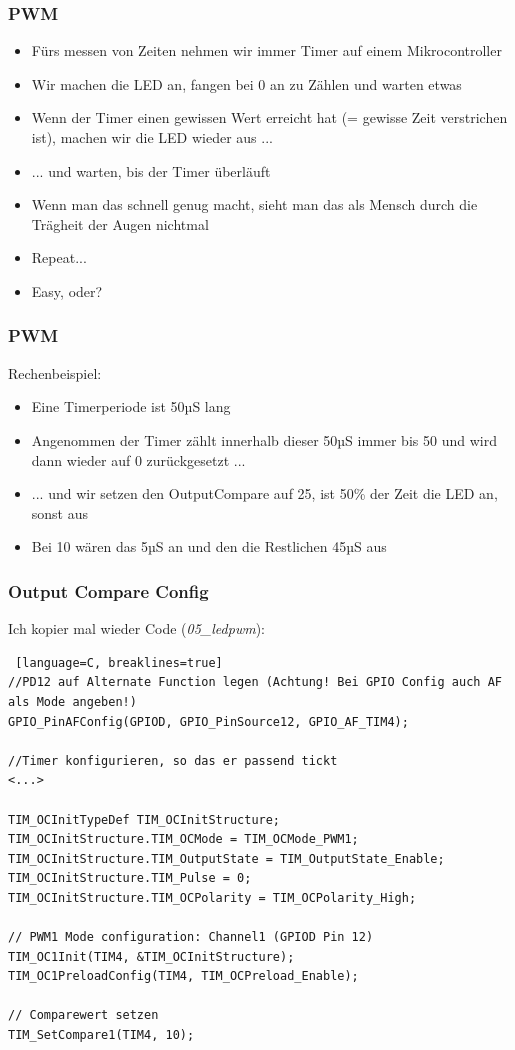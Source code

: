 \documentclass[ngerman,compress]{beamer}
\begin{document}
\begin{frame}
	\frametitle{PWM}
	\begin{itemize}
		\item Fürs messen von Zeiten nehmen wir immer Timer auf einem Mikrocontroller
		\item Wir machen die LED an, fangen bei 0 an zu Zählen und warten etwas
		\item Wenn der Timer einen gewissen Wert erreicht hat (= gewisse Zeit verstrichen ist), machen wir die LED wieder aus ...
		\item ... und warten, bis der Timer überläuft
		\item Wenn man das schnell genug macht, sieht man das als Mensch durch die Trägheit der Augen nichtmal
		\item Repeat...
		\pause
		\item Easy, oder?
	\end{itemize}
\end{frame}

\begin{frame}
	\frametitle{PWM}
	Rechenbeispiel:
	\begin{itemize}
		\item Eine Timerperiode ist 50µS lang
		\item Angenommen der Timer zählt innerhalb dieser 50µS immer bis 50 und wird dann wieder auf 0 zurückgesetzt ...
		\item ... und wir setzen den OutputCompare auf 25, ist 50\% der Zeit die LED an, sonst aus
		\item Bei 10 wären das 5µS an und den die Restlichen 45µS aus
	\end{itemize}
\end{frame}

\begin{frame}[fragile]
	\frametitle{Output Compare Config}
	Ich kopier mal wieder Code (\emph{05\_ledpwm}):
	\begin{lstlisting} [language=C, breaklines=true]
//PD12 auf Alternate Function legen (Achtung! Bei GPIO Config auch AF als Mode angeben!)
GPIO_PinAFConfig(GPIOD, GPIO_PinSource12, GPIO_AF_TIM4);

//Timer konfigurieren, so das er passend tickt
<...>

TIM_OCInitTypeDef TIM_OCInitStructure;
TIM_OCInitStructure.TIM_OCMode = TIM_OCMode_PWM1;
TIM_OCInitStructure.TIM_OutputState = TIM_OutputState_Enable;
TIM_OCInitStructure.TIM_Pulse = 0;
TIM_OCInitStructure.TIM_OCPolarity = TIM_OCPolarity_High;

// PWM1 Mode configuration: Channel1 (GPIOD Pin 12)
TIM_OC1Init(TIM4, &TIM_OCInitStructure);
TIM_OC1PreloadConfig(TIM4, TIM_OCPreload_Enable);

// Comparewert setzen
TIM_SetCompare1(TIM4, 10);
	\end{lstlisting}
\end{frame}
\end{document}

